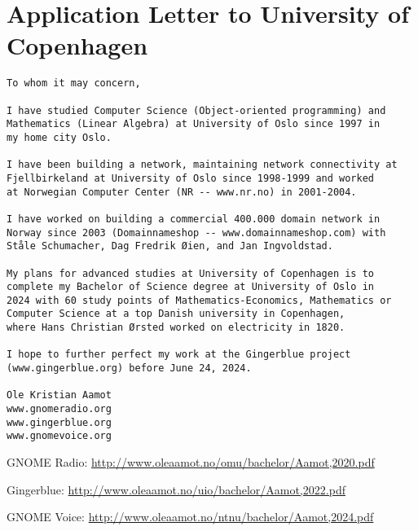 \documentclass[UKenglish]{ifimaster}  %
\begin{document}
\chapter*{Application Letter to University of Copenhagen}

\begin{verbatim}
To whom it may concern,

I have studied Computer Science (Object-oriented programming) and
Mathematics (Linear Algebra) at University of Oslo since 1997 in
my home city Oslo.

I have been building a network, maintaining network connectivity at
Fjellbirkeland at University of Oslo since 1998-1999 and worked
at Norwegian Computer Center (NR -- www.nr.no) in 2001-2004.

I have worked on building a commercial 400.000 domain network in
Norway since 2003 (Domainnameshop -- www.domainnameshop.com) with
Ståle Schumacher, Dag Fredrik Øien, and Jan Ingvoldstad.

My plans for advanced studies at University of Copenhagen is to
complete my Bachelor of Science degree at University of Oslo in
2024 with 60 study points of Mathematics-Economics, Mathematics or 
Computer Science at a top Danish university in Copenhagen,
where Hans Christian Ørsted worked on electricity in 1820.

I hope to further perfect my work at the Gingerblue project
(www.gingerblue.org) before June 24, 2024.

Ole Kristian Aamot
www.gnomeradio.org
www.gingerblue.org
www.gnomevoice.org
\end{verbatim}

\noindent GNOME Radio: \url{http://www.oleaamot.no/omu/bachelor/Aamot,2020.pdf}

\noindent Gingerblue: \url{http://www.oleaamot.no/uio/bachelor/Aamot,2022.pdf}

\noindent GNOME Voice: \url{http://www.oleaamot.no/ntnu/bachelor/Aamot,2024.pdf}
\end{document}
